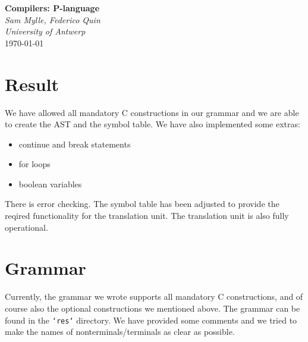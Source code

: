 \documentclass{article}
\begin{document}
\begin{titlepage}
   \begin{center}
      \Large\textbf{Compilers: P-language}\\
      \large\textit{Sam Mylle, Federico Quin \\ University of Antwerp} \\
      \today
   \end{center}
\end{titlepage}

\section{Result}
We have allowed all mandatory C constructions in our grammar and we are able to create the AST and the symbol table. We have also implemented some extras:
\begin{itemize}
   \item continue and break statements
   \item for loops
   \item boolean variables
\end{itemize}
\hfill \break
There is error checking. The symbol table has been adjusted to provide the reqired functionality for the translation unit. The translation unit is also fully operational.

\section{Grammar}
Currently, the grammar we wrote supports all mandatory C constructions, and of course also the optional constructions we mentioned above. The grammar can be found in the \texttt{`res`} directory. We have provided some comments and we tried to make the names of nonterminals/terminals as clear as possible.
\end{document}
